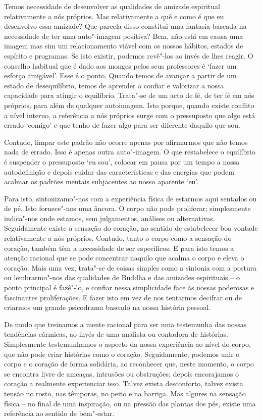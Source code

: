 Temos necessidade de desenvolver as qualidades de amizade espiritual
relativamente a nós próprios. Mas relativamente a quê e como é que eu desenvolvo
essa amizade? Que parcela disso constitui uma fantasia baseada na necessidade de
ter uma auto"-imagem positiva? Bem, não está em causa uma imagem mas sim um
relacionamento viável com os nossos hábitos, estados de espírito e programas. Se
isto existir, podemos revê"-los ao invés de lhes reagir. O conselho habitual que
é dado aos monges pelos seus professores é `fazer um esforço amigável'. Esse é o
ponto. Quando temos de avançar a partir de um estado de desequilíbrio, temos de
aprender a confiar e valorizar a nossa capacidade para atingir o equilíbrio.
Trata"-se de um acto de fé, de ter fé em nós próprios, para além de qualquer
autoimagem. Isto porque, quando existe conflito a nível interno, a referência a
nós próprios surge com o pressuposto que algo está errado `comigo' e que tenho
de fazer algo para ser diferente daquilo que sou.

Contudo, limpar este padrão não ocorre apenas por afirmarmos que não temos nada
de errado. Isso é apenas outra auto"-imagem. O que restabelece o equilíbrio é
suspender o pressuposto `eu sou', colocar em pausa por um tempo a nossa
autodefinição e depois cuidar das características e das energias que podem
acalmar os padrões mentais subjacentes ao nosso aparente `eu'.

Para isto, sintonizamo"-nos com a experiência física de estarmos aqui sentados
ou de pé. Isto fornece"-nos uma âncora. O corpo não pode proliferar;
simplesmente indica"-nos onde estamos, sem julgamentos, análises ou
alternativas. Seguidamente existe a sensação do coração, no sentido de
estabelecer boa vontade relativamente a nós próprios. Contudo, tanto o corpo
como a sensação do coração, também têm a necessidade de ser específicos. E para
isto temos a atenção racional que se pode concentrar naquilo que acalma o corpo
e eleva o coração. Mais uma vez, trata"-se de coisas simples como a sintonia com
a postura ou lembrarmo"-nos das qualidades de Buddha e das amizades espirituais
-- o ponto principal é fazê"-lo, e confiar nessa simplicidade face às nossas
poderosas e fascinantes proliferações. E fazer isto em vez de nos tentarmos
decifrar ou de criarmos um grande psicodrama baseado na nossa história pessoal.

De modo que treinamos a mente racional para ser uma testemunha das nossas
tendências cármicas, ao invés de uma analista ou contadora de histórias.
Simplesmente testemunhamos o aspecto da nossa experiência ao nível do corpo, que
não pode criar histórias como o coração. Seguidamente, podemos unir o corpo e o
coração de forma solidária, ao reconhecer que, neste momento, o corpo se
encontra livre de ameaças, intrusões ou obstruções; depois encorajamos o coração
a realmente experienciar isso. Talvez exista desconforto, talvez exista tensão
no rosto, nas têmporas, no peito e na barriga. Mas algures na sensação física --
no final de uma inspiração, ou na pressão das plantas dos pés, existe uma
referência ao sentido de bem"-estar.

